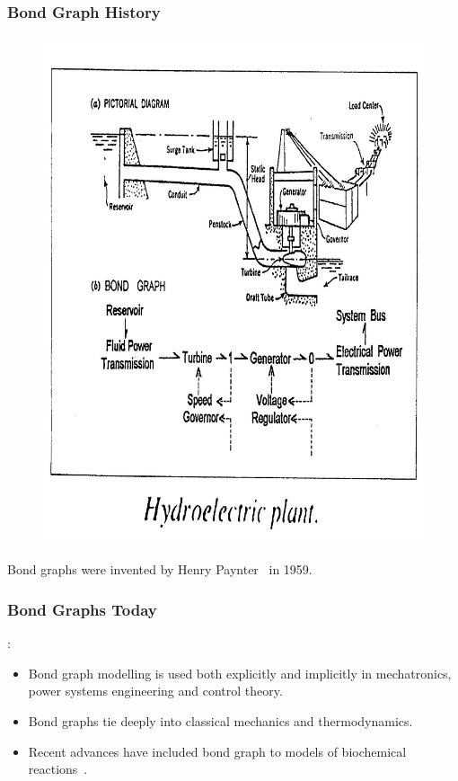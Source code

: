 \documentclass[11pt,reqno]{beamer}
\begin{document}
\begin{frame}
\frametitle{Bond Graph History}
\begin{figure}
\includegraphics[height=0.6\textheight, width=0.7\linewidth]{hydro.jpg}
\end{figure}
Bond graphs were invented by Henry Paynter~\cite{payter2000} in 1959.
\end{frame}
\begin{frame}
\frametitle{Bond Graphs Today}
:
\begin{itemize}
	\itemsep1em
	\item Bond graph modelling is used both explicitly and implicitly in mechatronics, power systems engineering and control theory.
	\item Bond graphs tie deeply into classical mechanics and thermodynamics.
	\item Recent advances have included bond graph to models of biochemical reactions~\cite{Gaw2017a, Gaw2017b, Gaw2014}.
\end{itemize}
\end{frame}
\end{document}
